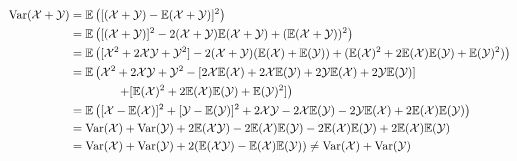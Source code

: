 \begin{enumerate}
\begin{myproof}
\begin{align*}
      \operatorname{Var}(\mathcal X + \mathcal Y) &= \mathbb E \left([(\mathcal X + \mathcal Y) - \mathbb E(\mathcal X + \mathcal Y)]^2\right) \\
                      &= \mathbb E \left([(\mathcal X + \mathcal Y)]^2 - 2(\mathcal X + \mathcal Y)\mathbb E(\mathcal X + \mathcal Y) + (\mathbb E(\mathcal X + \mathcal Y))^2\right) \\
                      &= \mathbb E \left([\mathcal X^2 + 2\mathcal X \mathcal Y + \mathcal Y^2] - 2(\mathcal X + \mathcal Y)(\mathbb E(\mathcal X) + \mathbb E(\mathcal Y)) + (\mathbb E(\mathcal X)^2 + 2\mathbb E(\mathcal X)\mathbb E(\mathcal Y) + \mathbb E(\mathcal Y)^2)\right) \\
                      &= \mathbb E \left(\mathcal X^2 + 2\mathcal X \mathcal Y + \mathcal Y^2 - [2\mathcal X\mathbb E(\mathcal X) + 2\mathcal X\mathbb E(\mathcal Y) + 2\mathcal Y\mathbb E(\mathcal X) + 2\mathcal Y\mathbb E(\mathcal Y)] \right. \\
                      &\qquad\qquad \left. + [\mathbb E(\mathcal X)^2 + 2\mathbb E(\mathcal X)\mathbb E(\mathcal Y) + \mathbb E(\mathcal Y)^2]\right) \\
                      &= \mathbb E \left([\mathcal X - \mathbb E(\mathcal X)]^2 + [\mathcal Y - \mathbb E(\mathcal Y)]^2 + 2\mathcal X \mathcal Y - 2\mathcal X\mathbb E(\mathcal Y) - 2\mathcal Y\mathbb E(\mathcal X) + 2\mathbb E(\mathcal X)\mathbb E(\mathcal Y)\right) \\
                      &= \operatorname{Var}(\mathcal X) + \operatorname{Var}(\mathcal Y) + 2\mathbb E(\mathcal X \mathcal Y) - 2\mathbb E(\mathcal X)\mathbb E(\mathcal Y) - 2\mathbb E(\mathcal X)\mathbb E(\mathcal Y) + 2\mathbb E(\mathcal X)\mathbb E(\mathcal Y) \\
                      &= \operatorname{Var}(\mathcal X) + \operatorname{Var}(\mathcal Y) + 2(\mathbb E(\mathcal X \mathcal Y) - \mathbb E(\mathcal X)\mathbb E(\mathcal Y)) \neq \operatorname{Var}(\mathcal X) + \operatorname{Var}(\mathcal Y)
    \end{align*}
  \end{myproof}
\end{enumerate}

